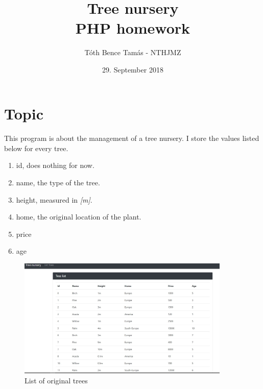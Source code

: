 \documentclass[]{article}
\begin{document}
\title{
Tree nursery \\
\small PHP homework
}
\author{Tóth Bence Tamás - NTHJMZ }
\date{29. September 2018}
\maketitle

\section{Topic}
\paragraph{} This program is about the management of a tree nursery.
I store the values listed below for every tree.
\begin{enumerate}
    \item id, does nothing for now.
    \item name, the type of the tree.
    \item height, measured in \textit{[m]}.
    \item home, the original location of the plant.
    \item price
    \item age
\end{enumerate}

\begin{figure}[h]
    \centering
    \includegraphics[width=0.9\textwidth]{treelist.JPG}
    \caption{List of original trees}
\end{figure}
\end{document}
